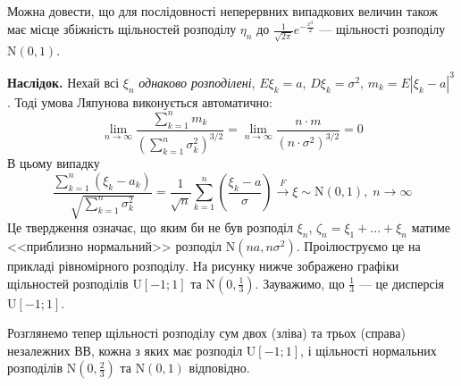 \begin{remark}
    Можна довести, що для послідовності неперервних випадкових величин також має місце збіжність щільностей розподілу $\eta_n$ до $\frac{1}{\sqrt{2\pi}} e^{-\frac{x^2}{2}}$
    --- щільності розподілу $\mathrm{N}(0, 1)$.
\end{remark}
\noindent\textbf{Наслідок.} Нехай всі $\xi_n$ \emph{однаково розподілені}, $E\xi_k = a$, $D\xi_k = \sigma^2$,
$m_k = E\left| \xi_k - a\right|^3$. Тоді умова Ляпунова виконується автоматично:
$$\underset{n \rightarrow \infty}{\lim} \frac{\sum\limits_{k=1}^n m_k}{\left(
    \sum\limits_{k=1}^n \sigma_k^2
\right)^{3/2}} = \underset{n \rightarrow \infty}{\lim} \frac{n \cdot m}{(n\cdot \sigma^2)^{3/2}} = 0$$
В цьому випадку
$$\frac{\sum\limits_{k=1}^n (\xi_k - a_k)}
{\sqrt{\sum\limits_{k=1}^n \sigma_k^2}}
= \frac{1}{\sqrt{n}} \sum\limits_{k=1}^n \left( \frac{\xi_k - a}{\sigma}\right) \overset{F}{\longrightarrow}\xi \sim \mathrm{N}(0, 1),
\;n \to \infty$$
Це твердження означає, що яким би не був розподіл $\xi_n$, $\zeta_n  = \xi_1 + ... + \xi_n$ матиме <<приблизно нормальний>> розподіл $\mathrm{N}(n a, n\sigma^2)$.
Проілюструємо це на прикладі рівномірного розподілу. На рисунку нижче зображено графіки щільностей розподілів
$\mathrm{U}[-1; 1]$ та $\mathrm{N}\left(0, \frac{1}{3}\right)$. Зауважимо, що $\frac{1}{3}$ --- це дисперсія $\mathrm{U}[-1; 1]$.
\begin{center}
\end{center}
Розглянемо тепер щільності розподілу сум двох (зліва) та трьох (справа) незалежних ВВ, кожна з яких має розподіл $\mathrm{U}[-1; 1]$, і щільності
нормальних розподілів $\mathrm{N}\left(0, \frac{2}{3}\right)$ та $\mathrm{N}\left(0, 1\right)$ відповідно.

